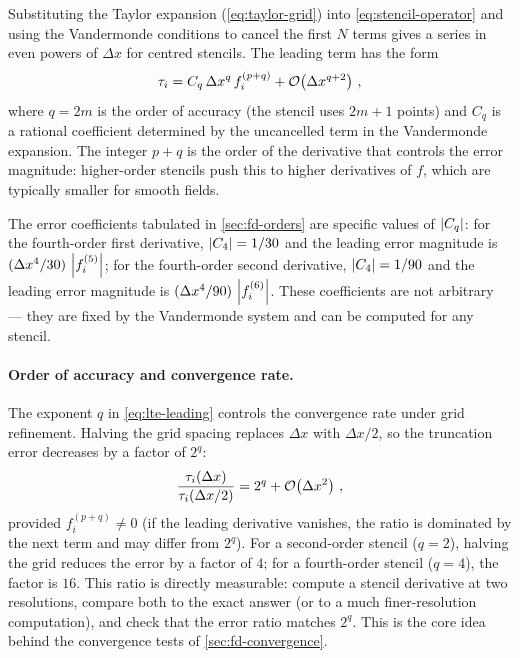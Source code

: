 Substituting the Taylor expansion (\cref{eq:taylor-grid}) into
\cref{eq:stencil-operator} and using the Vandermonde conditions to cancel
the first $N$ terms gives a series in even powers of $\Delta x$
for centred stencils.  The leading term has the form
%
\begin{equation}
  \tau_i = C_q\,\Delta x^q\,f^{(p+q)}_i
           + \mathcal{O}\!\left(\Delta x^{q+2}\right) \,,
  \label{eq:lte-leading}
\end{equation}
%
where $q = 2m$ is the order of accuracy (the stencil uses $2m + 1$ points)
and $C_q$ is a rational coefficient determined by the uncancelled term in
the Vandermonde expansion.  The integer $p + q$ is the order of the
derivative that controls the error magnitude: higher-order stencils push
this to higher derivatives of $f$, which are typically smaller for smooth
fields.

The error coefficients tabulated in \cref{sec:fd-orders} are specific
values of $\left\lvert C_q \right\rvert$: for the fourth-order first derivative,
$\left\lvert C_4 \right\rvert = 1/30$ and the leading error magnitude is
$(\Delta x^4/30)\,\left\lvert f^{(5)}_i \right\rvert$; for the fourth-order second
derivative, $\left\lvert C_4 \right\rvert = 1/90$ and the leading error magnitude is
$(\Delta x^4/90)\,\left\lvert f^{(6)}_i \right\rvert$.  These coefficients are not
arbitrary --- they are fixed by the Vandermonde system and can be computed
for any stencil.

\paragraph{Order of accuracy and convergence rate.}

The exponent $q$ in \cref{eq:lte-leading} controls the convergence rate
under grid refinement.  Halving the grid spacing replaces $\Delta x$ with
$\Delta x/2$, so the truncation error decreases by a factor of $2^q$:
%
\begin{equation}
  \frac{\tau_i(\Delta x)}{\tau_i(\Delta x/2)}
  = 2^q + \mathcal{O}\!\left(\Delta x^2\right) \,,
  \label{eq:convergence-ratio}
\end{equation}
%
provided $f^{(p+q)}_i \neq 0$ (if the leading derivative vanishes, the
ratio is dominated by the next term and may differ from $2^q$).
For a second-order stencil ($q = 2$), halving the grid reduces the error
by a factor of $4$; for a fourth-order stencil ($q = 4$), the factor is
$16$.  This ratio is directly measurable: compute a stencil derivative at
two resolutions, compare both to the exact answer (or to a much
finer-resolution computation), and check that the error ratio matches $2^q$.
This is the core idea behind the convergence tests of
\cref{sec:fd-convergence}.

